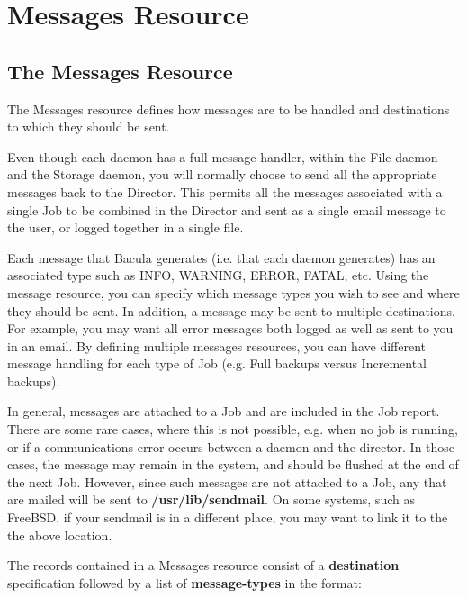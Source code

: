 
\section*{Messages Resource}
\label{_ChapterStart15}

\subsection*{The Messages Resource}
\label{MessageResource}

The Messages resource defines how messages are to be handled and destinations
to which they should be sent. 

Even though each daemon has a full message handler, within the File daemon and
the Storage daemon, you will normally choose to send all the appropriate
messages back to the Director. This permits all the messages associated with a
single Job to be combined in the Director and sent as a single email message
to the user, or logged together in a single file. 

Each message that Bacula generates (i.e. that each daemon generates) has an
associated type such as INFO, WARNING, ERROR, FATAL, etc. Using the message
resource, you can specify which message types you wish to see and where they
should be sent. In addition, a message may be sent to multiple destinations.
For example, you may want all error messages both logged as well as sent to
you in an email. By defining multiple messages resources, you can have
different message handling for each type of Job (e.g. Full backups versus
Incremental backups). 

In general, messages are attached to a Job and are included in the Job report.
There are some rare cases, where this is not possible, e.g. when no job is
running, or if a communications error occurs between a daemon and the
director. In those cases, the message may remain in the system, and should be
flushed at the end of the next Job. However, since such messages are not
attached to a Job, any that are mailed will be sent to {\bf
/usr/lib/sendmail}. On some systems, such as FreeBSD, if your sendmail is in a
different place, you may want to link it to the the above location. 

The records contained in a Messages resource consist of a {\bf destination}
specification followed by a list of {\bf message-types} in the format: 

